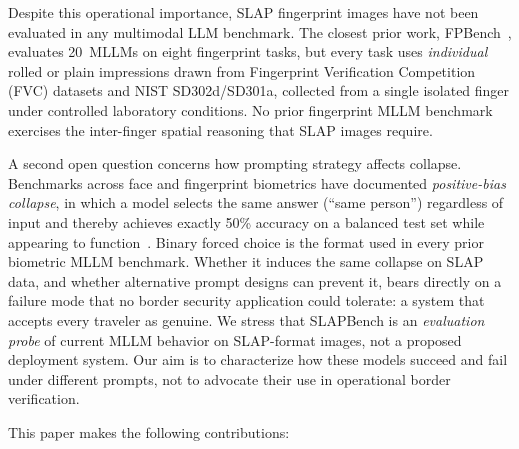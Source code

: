 \documentclass[journal]{IEEEtran}
\begin{document}
Despite this operational importance, SLAP fingerprint images have not
been evaluated in any multimodal LLM benchmark.
The closest prior work, FPBench~\cite{fpbench2025}, evaluates 20~MLLMs on
eight fingerprint tasks, but every task uses \emph{individual} rolled or
plain impressions drawn from Fingerprint Verification Competition (FVC)
datasets and NIST SD302d/SD301a, collected from a single isolated finger
under controlled laboratory conditions.
No prior fingerprint MLLM benchmark exercises the inter-finger spatial
reasoning that SLAP images require.

A second open question concerns how prompting strategy affects collapse.
Benchmarks across face and fingerprint biometrics have documented
\emph{positive-bias collapse}, in which a model selects the same answer
(``same person'') regardless of input and thereby achieves exactly 50\%
accuracy on a balanced test set while appearing to
function~\cite{facerecbench2025,fpbench2025}.
Binary forced choice is the format used in every prior biometric MLLM
benchmark. Whether it induces the same collapse on SLAP data, and whether
alternative prompt designs can prevent it, bears directly on a failure
mode that no border security application could tolerate: a system that
accepts every traveler as genuine.
We stress that SLAPBench is an \emph{evaluation probe} of current MLLM
behavior on SLAP-format images, not a proposed deployment system. Our aim
is to characterize how these models succeed and fail under different
prompts, not to advocate their use in operational border verification.

This paper makes the following contributions:
\end{document}
